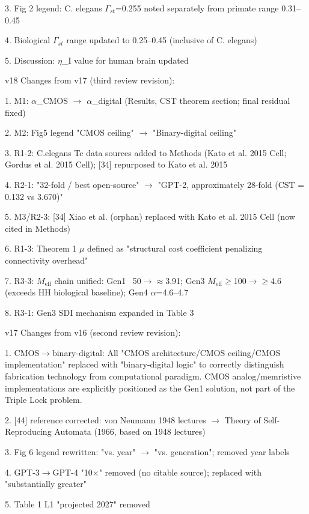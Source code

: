 \documentclass[a4paper,12pt]{article}
\begin{document}
3. Fig 2 legend: C. elegans $\Gamma_{st}$=0.255 noted separately from primate range 0.31--0.45

4. Biological $\Gamma_{st}$ range updated to 0.25--0.45 (inclusive of C. elegans)

5. Discussion: $\eta$_I value for human brain updated

v18 Changes from v17 (third review revision):

1. M1: $\alpha$_CMOS $\rightarrow$ $\alpha$_digital (Results, CST theorem section; final residual fixed)

2. M2: Fig5 legend "CMOS ceiling" $\rightarrow$ "Binary-digital ceiling"

3. R1-2: C.elegans Tc data sources added to Methods (Kato et al. 2015 Cell; Gordus et al. 2015 Cell); [34] repurposed to Kato et al. 2015

4. R2-1: "32-fold / best open-source" $\rightarrow$ "GPT-2, approximately 28-fold (CST = 0.132 vs 3.670)"

5. M3/R2-3: [34] Xiao et al. (orphan) replaced with Kato et al. 2015 Cell (now cited in Methods)

6. R1-3: Theorem 1 $\mu$ defined as "structural cost coefficient penalizing connectivity overhead"

7. R3-3: $M_{\text{eff}}$ chain unified: Gen1 ~50$\rightarrow$\alpha$\approx$3.91; Gen3 $M_{\text{eff}}$$\geq$100$\rightarrow$\alpha$\geq$4.6 (exceeds HH biological baseline); Gen4 $\alpha$=4.6--4.7

8. R3-1: Gen3 SDI mechanism expanded in Table 3

v17 Changes from v16 (second review revision):

1. CMOS$\rightarrow$binary-digital: All "CMOS architecture/CMOS ceiling/CMOS implementation" replaced with "binary-digital logic" to correctly distinguish fabrication technology from computational paradigm. CMOS analog/memristive implementations are explicitly positioned as the Gen1 solution, not part of the Triple Lock problem.

2. [44] reference corrected: von Neumann 1948 lectures $\rightarrow$ Theory of Self-Reproducing Automata (1966, based on 1948 lectures)

3. Fig 6 legend rewritten: "vs. year" $\rightarrow$ "vs. generation"; removed year labels

4. GPT-3$\rightarrow$GPT-4 "10$\times$" removed (no citable source); replaced with "substantially greater"

5. Table 1 L1 "projected 2027" removed
\end{document}
